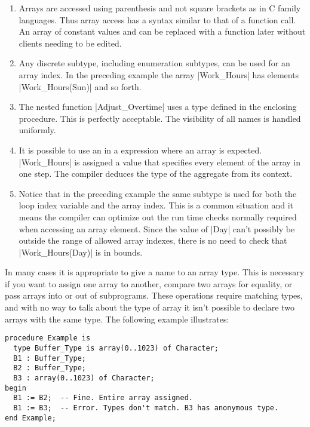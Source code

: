\begin{enumerate}

\item Arrays are accessed using parenthesis and not square brackets as in C family languages.
  Thus array access has a syntax similar to that of a function call. An array of constant values
  and can be replaced with a function later without clients needing to be edited.

\item Any discrete subtype, including enumeration subtypes, can be used for an array index. In
  the preceding example the array |Work_Hours| has elements |Work_Hours(Sun)| and so forth.

\item The nested function |Adjust_Overtime| uses a type defined in the enclosing procedure. This
  is perfectly acceptable. The visibility of all names is handled uniformly.

\item It is possible to use an  in a expression where an array is
  expected. |Work_Hours| is assigned a value that specifies every element of the array in one
  step. The compiler deduces the type of the aggregate from its context.

\item Notice that in the preceding example the same subtype is used for both the loop index
  variable and the array index. This is a common situation and it means the compiler can
  optimize out the run time checks normally required when accessing an array element. Since the
  value of |Day| can't possibly be outside the range of allowed array indexes, there is no need
  to check that |Work_Hours(Day)| is in bounds.

\end{enumerate}

In many cases it is appropriate to give a name to an array type. This is necessary if you want
to assign one array to another, compare two arrays for equality, or pass arrays into or out of
subprograms. These operations require matching types, and with no way to talk about the type of
array it isn't possible to declare two arrays with the same type. The following example
illustrates:

\begin{lstlisting}
procedure Example is
  type Buffer_Type is array(0..1023) of Character;
  B1 : Buffer_Type;
  B2 : Buffer_Type;
  B3 : array(0..1023) of Character;
begin
  B1 := B2;  -- Fine. Entire array assigned.
  B1 := B3;  -- Error. Types don't match. B3 has anonymous type.
end Example;
\end{lstlisting}

